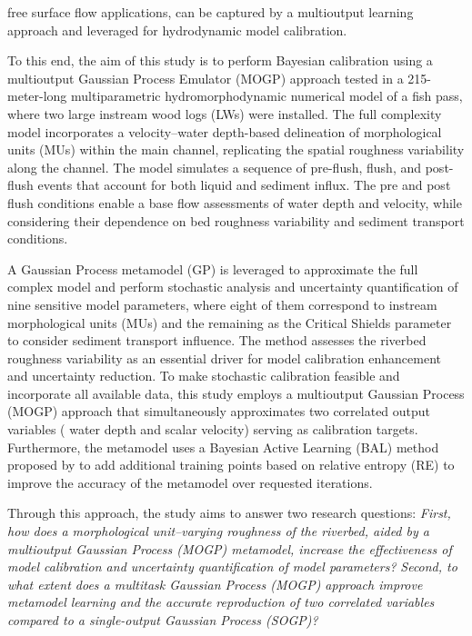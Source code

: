 \documentclass[draft,linenumbers,onecolumn]{agujournal2019} %
\begin{document}
free surface flow applications, can be captured by a multioutput learning approach and leveraged for hydrodynamic model calibration.

% 
To this end, the aim of this study is to perform Bayesian calibration using a multioutput Gaussian Process Emulator (MOGP) approach tested in a 215-meter-long multiparametric hydromorphodynamic numerical model of a fish pass, where two large instream wood logs (LWs) were installed. The full complexity model incorporates a velocity–water depth-based delineation of morphological units (MUs) within the main channel, replicating the spatial roughness variability along the channel. The model simulates a sequence of pre-flush, flush, and post-flush events that account for both liquid and sediment influx. The pre and post flush conditions enable a base flow assessments of water depth and velocity, while considering their dependence on bed roughness variability and sediment transport conditions.

A Gaussian Process metamodel (GP) is leveraged to approximate the full complex model and perform stochastic analysis and uncertainty quantification of nine sensitive model parameters, where eight of them correspond to instream morphological units (MUs) and the remaining as the Critical Shields parameter to consider sediment transport influence. The method assesses the riverbed roughness variability as an essential driver for model calibration enhancement and uncertainty reduction. To make stochastic calibration feasible and incorporate all available data, this study employs a multioutput Gaussian Process (MOGP) approach that simultaneously approximates two correlated output variables ( water depth and scalar velocity) serving as calibration targets.
Furthermore, the metamodel uses a Bayesian Active Learning (BAL) method proposed by  to add additional training points based on relative entropy (RE) to improve the accuracy of the metamodel over requested iterations. 

Through this approach, the study aims to answer two research questions: \textit{First, how does a morphological unit–varying roughness of the riverbed, aided by a multioutput Gaussian Process (MOGP) metamodel, increase the effectiveness of model calibration and uncertainty quantification of model parameters?} \textit{Second, to what extent does a multitask Gaussian Process (MOGP) approach improve metamodel learning and the accurate reproduction of two correlated variables compared to a single-output Gaussian Process (SOGP)?}
\end{document}
